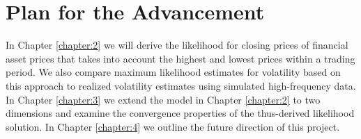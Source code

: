 \section{Plan for the Advancement}
In Chapter \ref{chapter:2} we will derive the likelihood for closing prices of financial asset prices that takes into account the highest and lowest prices within a trading period. We also compare maximum likelihood estimates for volatility based on this approach to realized volatility estimates using simulated high-frequency data. In Chapter \ref{chapter:3} we extend the model in Chapter \ref{chapter:2} to two dimensions and examine the convergence properties of the thus-derived likelihood solution. In Chapter \ref{chapter:4} we outline the future direction of this project. 



